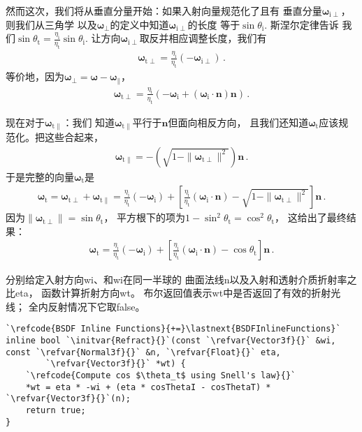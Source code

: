 然而这次，我们将从垂直分量开始：如果入射向量规范化了且有
垂直分量${\bm\omega}_{\mathrm{i}\perp}$，则我们从三角学
以及${\bm\omega}_{\perp}$的定义中知道${\bm\omega}_{\mathrm{i}\perp}$的长度
等于$\sin\theta_{\mathrm{i}}$. 斯涅尔定律告诉
我们$\displaystyle\sin\theta_{\mathrm{t}}=\frac{\eta_{\mathrm{i}}}{\eta_{\mathrm{t}}}\sin\theta_{\mathrm{i}}$.
让方向${\bm\omega}_{\mathrm{i}\perp}$取反并相应调整长度，我们有
\begin{align*}
    {\bm\omega}_{\mathrm{t}\perp}=\frac{\eta_{\mathrm{i}}}{\eta_{\mathrm{t}}}(-{\bm\omega}_{\mathrm{i}\perp})\, .
\end{align*}
等价地，因为${\bm\omega}_{\perp}={\bm\omega}-{\bm\omega}_{\parallel}$，
\begin{align*}
    {\bm\omega}_{\mathrm{t}\perp}=\frac{\eta_{\mathrm{i}}}{\eta_{\mathrm{t}}}(-{\bm\omega}_{\mathrm{i}}+({\bm\omega}_{\mathrm{i}}\cdot{\bm n}){\bm n})\, .
\end{align*}

现在对于${\bm\omega}_{\mathrm{t}\parallel}$：我们
知道${\bm\omega}_{\mathrm{t}\parallel}$平行于$\bm n$但面向相反方向，
且我们还知道${\bm\omega}_{\mathrm{t}}$应该规范化。把这些合起来，
\begin{align*}
    {\bm\omega}_{\mathrm{t}\parallel}=-\left(\sqrt{1-\|{\bm\omega}_{\mathrm{t}\perp}\|^2}\right){\bm n}\, .
\end{align*}
于是完整的向量${\bm\omega}_{\mathrm{t}}$是
\begin{align*}
    {\bm\omega}_{\mathrm{t}}={\bm\omega}_{\mathrm{t}\perp}+{\bm\omega}_{\mathrm{t}\parallel}=\frac{\eta_{\mathrm{i}}}{\eta_{\mathrm{t}}}(-{\bm\omega}_{\mathrm{i}})+\left[\frac{\eta_{\mathrm{i}}}{\eta_{\mathrm{t}}}({\bm\omega}_{\mathrm{i}}\cdot{\bm n})-\sqrt{1-\|{\bm\omega}_{\mathrm{t}\perp}\|^2}\right]{\bm n}\, .
\end{align*}
因为$\|{\bm\omega}_{\mathrm{t}\perp}\|=\sin\theta_{\mathrm{t}}$，
平方根下的项为$1-\sin^2\theta_{\mathrm{t}}=\cos^2\theta_{\mathrm{t}}$，
这给出了最终结果：
\begin{align}
    \label{eq:8.8}
    {\bm\omega}_{\mathrm{t}}=\frac{\eta_{\mathrm{i}}}{\eta_{\mathrm{t}}}(-{\bm\omega}_{\mathrm{i}})+\left[\frac{\eta_{\mathrm{i}}}{\eta_{\mathrm{t}}}({\bm\omega}_{\mathrm{i}}\cdot{\bm n})-\cos\theta_{\mathrm{t}}\right]{\bm n}\, .
\end{align}

分别给定入射方向{\ttfamily wi}、和{\ttfamily wi}在同一半球的
曲面法线{\ttfamily n}以及入射和透射介质折射率之比{\ttfamily eta}，
函数计算折射方向{\ttfamily wt}。
布尔返回值表示{\ttfamily *wt}中是否返回了有效的折射光线；
全内反射情况下它取{\ttfamily false}。
\begin{lstlisting}
`\refcode{BSDF Inline Functions}{+=}\lastnext{BSDFInlineFunctions}`
inline bool `\initvar{Refract}{}`(const `\refvar{Vector3f}{}` &wi, const `\refvar{Normal3f}{}` &n, `\refvar{Float}{}` eta,
        `\refvar{Vector3f}{}` *wt) {
    `\refcode{Compute cos $\theta_t$ using Snell's law}{}`
    *wt = eta * -wi + (eta * cosThetaI - cosThetaT) * `\refvar{Vector3f}{}`(n);
    return true;
}
\end{lstlisting}

